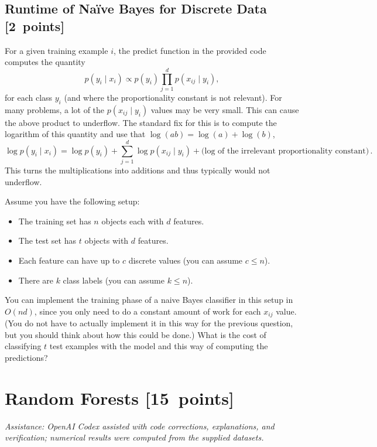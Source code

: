 \documentclass{article}
\newcommand{\blu}[1]{{\textcolor{blu}{#1}}}
\let\ask\blu
\newcommand\pts[1]{\textcolor{pointscolour}{[#1~points]}}
\begin{document}
    \subsection{Runtime of Na\"ive Bayes for Discrete Data \pts{2}}

    For a given training example $i$, the predict function in the provided code computes the quantity
    \[
    p(y_i \mid x_i) \propto p(y_i)\prod_{j=1}^d p(x_{ij} \mid y_i),
    \]
    for each class $y_i$ (and where the proportionality constant is not relevant). For many problems, a lot of the $p(x_{ij} \mid y_i)$ values may be very small. This can cause the above product to underflow. The standard fix for this is to compute the logarithm of this quantity and use that $\log(ab) = \log(a)+\log(b)$,
    \[
    \log p(y_i \mid x_i) = \log p(y_i) + \sum_{j=1}^d \log p(x_{ij} \mid y_i) + \text{(log of the irrelevant proportionality constant)} \, .
    \]
    This turns the multiplications into additions and thus typically would not underflow.

    Assume you have the following setup:
    \begin{itemize}
        \item The training set has $n$ objects each with $d$ features.
        \item The test set has $t$ objects with $d$ features.
        \item Each feature can have up to $c$ discrete values (you can assume $c \leq n$).
        \item There are $k$ class labels (you can assume $k \leq n$).
    \end{itemize}
    You can implement the training phase of a naive Bayes classifier in this setup in $O(nd)$, since you only need to do a constant amount of work for each $x_{ij}$ value. (You do not have to actually implement it in this way for the previous question, but you should think about how this could be done.)
    \ask{What is the cost of classifying $t$ test examples with the model and this way of computing the predictions?}


    \clearpage
    \section{Random Forests \pts{15}}
    {\small\textit{Assistance: OpenAI Codex assisted with code corrections, explanations, and verification; numerical results were computed from the supplied datasets.}}
\end{document}
